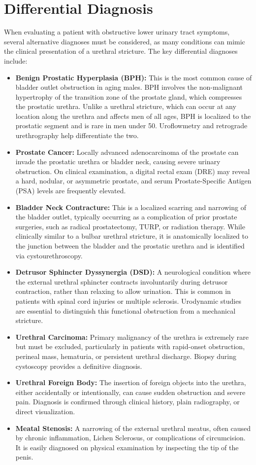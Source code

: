 \section*{Differential Diagnosis}
When evaluating a patient with obstructive lower urinary tract symptoms, several alternative diagnoses must be considered, as many conditions can mimic the clinical presentation of a urethral stricture. The key differential diagnoses include:

\begin{itemize}
  \item \textbf{Benign Prostatic Hyperplasia (BPH):} This is the most common cause of bladder outlet obstruction in aging males. BPH involves the non-malignant hypertrophy of the transition zone of the prostate gland, which compresses the prostatic urethra. Unlike a urethral stricture, which can occur at any location along the urethra and affects men of all ages, BPH is localized to the prostatic segment and is rare in men under 50. Uroflowmetry and retrograde urethrography help differentiate the two.
  \item \textbf{Prostate Cancer:} Locally advanced adenocarcinoma of the prostate can invade the prostatic urethra or bladder neck, causing severe urinary obstruction. On clinical examination, a digital rectal exam (DRE) may reveal a hard, nodular, or asymmetric prostate, and serum Prostate-Specific Antigen (PSA) levels are frequently elevated.
  \item \textbf{Bladder Neck Contracture:} This is a localized scarring and narrowing of the bladder outlet, typically occurring as a complication of prior prostate surgeries, such as radical prostatectomy, TURP, or radiation therapy. While clinically similar to a bulbar urethral stricture, it is anatomically localized to the junction between the bladder and the prostatic urethra and is identified via cystourethroscopy.
  \item \textbf{Detrusor Sphincter Dyssynergia (DSD):} A neurological condition where the external urethral sphincter contracts involuntarily during detrusor contraction, rather than relaxing to allow urination. This is common in patients with spinal cord injuries or multiple sclerosis. Urodynamic studies are essential to distinguish this functional obstruction from a mechanical stricture.
  \item \textbf{Urethral Carcinoma:} Primary malignancy of the urethra is extremely rare but must be excluded, particularly in patients with rapid-onset obstruction, perineal mass, hematuria, or persistent urethral discharge. Biopsy during cystoscopy provides a definitive diagnosis.
  \item \textbf{Urethral Foreign Body:} The insertion of foreign objects into the urethra, either accidentally or intentionally, can cause sudden obstruction and severe pain. Diagnosis is confirmed through clinical history, plain radiography, or direct visualization.
  \item \textbf{Meatal Stenosis:} A narrowing of the external urethral meatus, often caused by chronic inflammation, Lichen Sclerosus, or complications of circumcision. It is easily diagnosed on physical examination by inspecting the tip of the penis.
\end{itemize}

